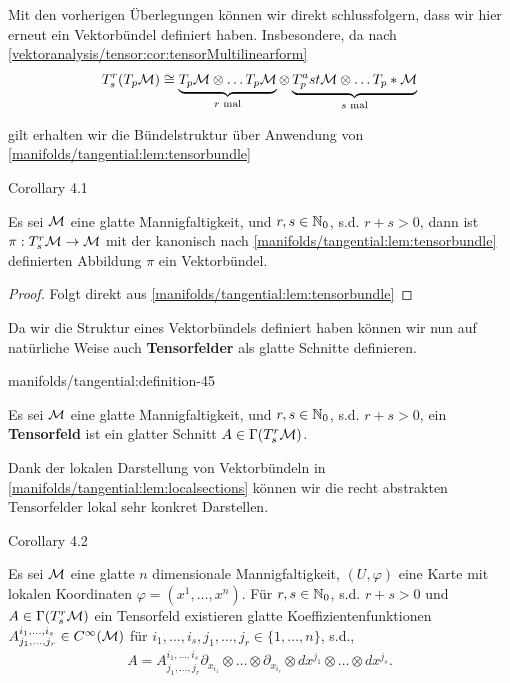 \par
Mit den vorherigen Überlegungen können wir direkt schlussfolgern, dass wir hier erneut ein Vektorbündel definiert haben. Insbesondere, da nach \cref{vektoranalysis/tensor:cor:tensorMultilinearform} \begin{align*}
T^r_s(T_p\mathcal{M}) \cong \underbrace{T_p\mathcal{M}\otimes\ldots T_p\mathcal{M}}_{r\text{ mal}}\otimes\underbrace{T_p^ast\mathcal{M}\otimes\ldots T_p\ast\mathcal{M}}_{s\text{ mal}}
\end{align*}
\par
gilt erhalten wir die Bündelstruktur über Anwendung von \cref{manifolds/tangential:lem:tensorbundle} 
\label{manifolds/tangential:corollary-44}
\begin{emphBox}{}{}{Corollary 4.1}



\par
Es sei \(\mathcal{M}\) eine glatte Mannigfaltigkeit, und \(r,s\in\mathbb{N}_0\), s.d. \(r+s>0\), dann ist \(\pi:T^r_s\mathcal{M}\to\mathcal{M}\) mit der kanonisch nach \cref{manifolds/tangential:lem:tensorbundle} definierten Abbildung \(\pi\) ein Vektorbündel.
\end{emphBox}

\begin{proof}
 Folgt direkt aus \cref{manifolds/tangential:lem:tensorbundle} 
\end{proof}

\par
Da wir die Struktur eines Vektorbündels definiert haben können wir nun auf natürliche Weise auch \textbf{Tensorfelder} als glatte Schnitte definieren.
\begin{definition}{}{manifolds/tangential:definition-45}



\par
Es sei \(\mathcal{M}\) eine glatte Mannigfaltigkeit, und \(r,s\in\mathbb{N}_0\), s.d. \(r+s>0\), ein \textbf{Tensorfeld} ist ein glatter Schnitt \(A\in \Gamma(T^r_s\mathcal{M})\).
\end{definition}

\par
Dank der lokalen Darstellung von Vektorbündeln in \cref{manifolds/tangential:lem:localsections} können wir die recht abstrakten Tensorfelder lokal sehr konkret Darstellen.
\label{manifolds/tangential:cor:tensorfieldchart}
\begin{emphBox}{}{}{Corollary 4.2}



\par
Es sei \(\mathcal{M}\) eine glatte \(n\) dimensionale Mannigfaltigkeit, \((U,\varphi)\) eine Karte mit lokalen Koordinaten \(\varphi=(x^1,\ldots,x^n)\). Für \(r,s\in\mathbb{N}_0\), s.d. \(r+s>0\) und \(A\in \Gamma(T^r_s\mathcal{M})\) ein Tensorfeld existieren glatte Koeffizientenfunktionen \(A^{i_1,\ldots, i_s}_{j_1,\ldots,j_r}\in C^\infty(\mathcal{M})\) für \(i_1,\ldots, i_s, j_1,\ldots, j_r\in \{1,\ldots,n\}\), s.d.,
\begin{align*}
A = A^{i_1,\ldots,i_s}_{j_1,\ldots,j_r} \partial_{x_{i_1}}\otimes\ldots\otimes \partial_{x_{i_r}}\otimes dx^{j_1}\otimes\ldots\otimes dx^{j_s}.
\end{align*}\end{emphBox}

